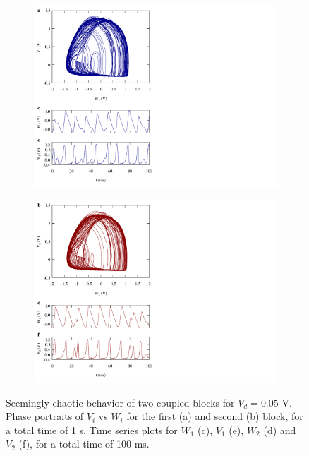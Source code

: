 \begin{figure}[!htbp]
    \centering
    \begin{minipage}{.49\textwidth}
        \begin{subfigure}{\linewidth}
            \centering
            \includegraphics[width=\linewidth,trim={0cm 0 11cm 0},clip,center]
            {../blocks/2_blocks/4e4_points/plots/waveforms_1.pdf}
        \end{subfigure}
    \end{minipage}
    \begin{minipage}{.49\textwidth}
        \begin{subfigure}{\linewidth}
            \centering
            \includegraphics[width=\linewidth,trim={0cm 0 11cm 0},clip,center]
            {../blocks/2_blocks/4e4_points/plots/waveforms_2.pdf}
        \end{subfigure}
    \end{minipage}
    \caption{Seemingly chaotic behavior of two coupled blocks for $V_d=0.05$ V.
    Phase portraits of $V_i$ vs $W_i$ for the first (a) and second (b) block, for a total time of 1 s.
    Time series plots for $W_1$ (c), $V_1$ (e), $W_2$ (d) and $V_2$ (f), for a total time of 100 ms.
    }\label{fig:2 blocks waveforms}
\end{figure}

